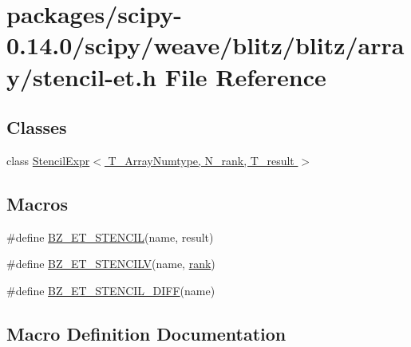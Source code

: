 \hypertarget{stencil-et_8h}{}\section{packages/scipy-\/0.14.0/scipy/weave/blitz/blitz/array/stencil-\/et.h File Reference}
\label{stencil-et_8h}
\subsection*{Classes}
\begin{DoxyCompactItemize}
\item 
class \hyperlink{classStencilExpr}{Stencil\+Expr$<$ T\+\_\+\+Array\+Numtype, N\+\_\+rank, T\+\_\+result $>$}
\end{DoxyCompactItemize}
\subsection*{Macros}
\begin{DoxyCompactItemize}
\item 
\#define \hyperlink{stencil-et_8h_a0b2b395ca6c45ee7b4f6a0799aeb4652}{B\+Z\+\_\+\+E\+T\+\_\+\+S\+T\+E\+N\+C\+I\+L}(name,  result)
\item 
\#define \hyperlink{stencil-et_8h_a8ec62d39728d5aa744f66c7466437848}{B\+Z\+\_\+\+E\+T\+\_\+\+S\+T\+E\+N\+C\+I\+L\+V}(name,  \hyperlink{zfftnd_8c_a6cfd95afd0afebd625b889fb6e58371c}{rank})
\item 
\#define \hyperlink{stencil-et_8h_a0e73eca8baf24d9b319a20afa5e03fec}{B\+Z\+\_\+\+E\+T\+\_\+\+S\+T\+E\+N\+C\+I\+L\+\_\+\+D\+I\+F\+F}(name)
\end{DoxyCompactItemize}


\subsection{Macro Definition Documentation}
\hypertarget{stencil-et_8h_a0b2b395ca6c45ee7b4f6a0799aeb4652}{}

